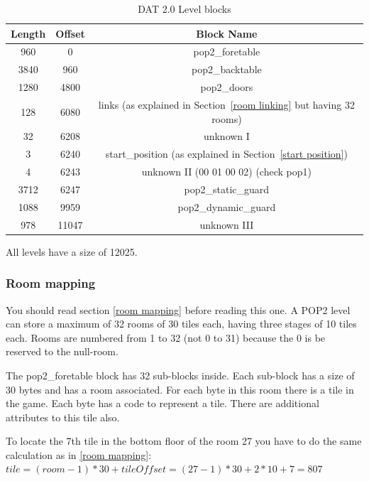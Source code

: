 \documentclass{article}
\begin{document}
\begin{table}
\begin{tabular}{ccc}
\hline
 Length& Offset & Block Name \\
\hline
 960   & 0      & pop2\_foretable \\
 3840  & 960    & pop2\_backtable \\
 1280  & 4800   & pop2\_doors \\
 128   & 6080   & links (as explained in Section~\ref{room linking} but having 32 rooms) \\
 32    & 6208   & unknown I \\
 3     & 6240   & start\_position (as explained in Section~\ref{start position}) \\
 4     & 6243   & unknown II (00 01 00 02) (check pop1) \\
 3712  & 6247   & pop2\_static\_guard \\
 1088  & 9959   & pop2\_dynamic\_guard \\
 978   & 11047  & unknown III \\
\hline
\end{tabular}
\caption{DAT 2.0 Level blocks}
\label{dat2 level blocks}
\end{table}

 All levels have a size of 12025.

\subsubsection{Room mapping \label{dat2 room mapping}} %
 You should read section \ref{room mapping} before reading this one.
 A POP2 level can store a maximum of 32 rooms of 30 tiles each, having 
 three stages of 10 tiles each. Rooms are numbered from 1 to 32 (not 0 to 
 31) because the 0 is be reserved to the null-room.

 The pop2\_foretable block has 32 sub-blocks inside. Each sub-block has a
 size of 30 bytes and has a room associated. For each byte in this room
 there is a tile in the game. Each byte has a code to represent a tile.
 There are additional attributes to this tile also.
 
 To locate the 7th tile in the bottom floor of the room 27 you have to do
 the same calculation as in \ref{room mapping}:
  $tile=(room-1)*30+tileOffset=(27-1)*30+2*10+7=807$
 
\end{document}
